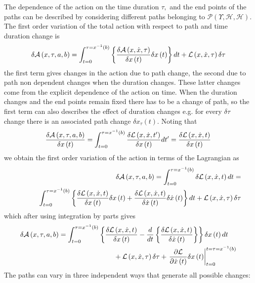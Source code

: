\documentclass[aps,preprint]{revtex4}
\begin{document}
The dependence of the action on the time duration $\tau ,$ and the end
points of the paths can be described by considering different paths
belonging to $\mathcal{P}\left( \Upsilon ,\mathcal{H},\mathcal{H}\right) $.
The first order variation of the total action with respect to path and time
duration change is
\begin{equation}
\delta \mathcal{A}\left( x,\tau ,a,b\right) =\int_{t=0}^{\tau =x^{-1}\left(
b\right) }\left\{ \frac{\delta \mathcal{A}\left( x,\dot{x},\tau \right) }{%
\delta x\left( t\right) }\delta x\left( t\right) \right\} dt+\mathcal{L}%
\left( x,\dot{x},\tau \right) \delta \tau
\end{equation}%
the first term gives changes in the action due to path change, the second
due to path non dependent changes when the duration changes. These latter
changes come from the explicit dependence of the action on time. When the
duration changes and the end points remain fixed there has to be a change of
path, so the first term can also describes the effect of duration changes
e.g. for every $\delta \tau $ change there is an associated path change $%
\delta x_{\tau }\left( t\right) $. Noting that
\begin{equation}
\frac{\delta \mathcal{A}\left( x,\tau ,a,b\right) }{\delta x\left( t\right) }%
=\int_{t=0}^{\tau =x^{-1}\left( b\right) }\frac{\delta \mathcal{L}\left( x,%
\dot{x},t^{\prime }\right) }{\delta x\left( t\right) }dt^{\prime }=\frac{%
\delta \mathcal{L}\left( x,\dot{x},t\right) }{\delta x\left( t\right) }
\end{equation}%
we obtain the first order variation of the action in terms of the Lagrangian
as
\begin{eqnarray}
&&\delta \mathcal{A}\left( x,\tau ,a,b\right) =\int_{t=0}^{\tau
=x^{-1}\left( b\right) }\delta \mathcal{L}\left( x,\dot{x},t\right) dt=
\notag \\
&&\left. {}\right. \qquad \int_{t=0}^{\tau =x^{-1}\left( b\right) }\left\{
\frac{\delta \mathcal{L}\left( x,\dot{x},t\right) }{\delta x\left( t\right) }%
\delta x\left( t\right) +\frac{\delta \mathcal{L}\left( x,\dot{x},t\right) }{%
\delta \dot{x}\left( t\right) }\delta \dot{x}\left( t\right) \right\} dt+%
\mathcal{L}\left( x,\dot{x},\tau \right) \delta \tau
\end{eqnarray}%
which after using integration by parts gives
\begin{align}
\delta \mathcal{A}\left( x,\tau ,a,b\right) & =\int_{t=0}^{\tau
=x^{-1}\left( b\right) }\left\{ \frac{\delta \mathcal{L}\left( x,\dot{x}%
,t\right) }{\delta x\left( t\right) }-\frac{d}{dt}\left\{ \frac{\delta
\mathcal{L}\left( x,\dot{x},t\right) }{\delta \dot{x}\left( t\right) }%
\right\} \right\} \delta x\left( t\right) dt  \notag \\
& \qquad \qquad \qquad \qquad +\mathcal{L}\left( x,\dot{x},\tau \right)
\delta \tau +\left. \frac{\partial \mathcal{L}}{\partial \dot{x}\left(
t\right) }\delta x\left( t\right) \right\vert _{t=0}^{t=\tau =x^{-1}\left(
b\right) }
\end{align}%
The paths can vary in three independent ways that generate all possible
changes:
\end{document}

